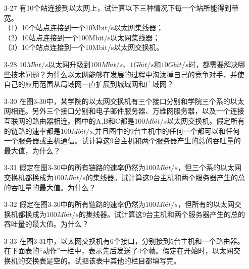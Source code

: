 \documentclass[a4paper,UTF8]{article}
\begin{document}
\begin{enumerate}
\begin{solution}
\end{solution}

\item[3-27] 有10个站连接到以太网上，试计算以下三种情况下每一个站所能得到带宽。\\
（1）10个站点连接到一个10Mbit/s以太网集线器；\\
（2）10站点连接到一个100Mbit/s以太网集线器；\\
（3）10个站点连接到一个10Mbit/s以太网交换机。
\begin{solution}

\end{solution}

\item[3-28] $10Mbit/s$以太网升级到$100Mbit/s$、$1Gbit/s$和$10Gbit/s$时，都需要解决哪些技术问题？为什么以太网能够在发展的过程中淘汰掉自己的竞争对手，并使自己的应用范围从局域网一直扩展到城域网和广域网？
\begin{solution}

\end{solution}

\item[3-30] 在图3-30中，某学院的以太网交换机有三个接口分别和学院三个系的以太网相连。另外三个接口分别和电子邮件服务器、万维网服务器，以及一个连接互联网的路由器相连。图中的A,B和C都是$100Mbit/s$以太网交换机。假定所有的链路的速率都是$100Mbit/s$,并且图中的9台主机中的任何一个都可以和任何一个服务器或主机通信。试计算这9台主机和两个服务器产生的总的吞吐量的最大值，为什么？ 
\begin{solution}

\end{solution}

\item[3-31] 假定在图3-30中的所有链路的速率仍然为$100Mbit/s$，但三个系的以太网交换机都换成为$100Mbit/s$的集线器。试计算这9台主机和两个服务器产生的总的吞吐量的最大值。为什么？ 
\begin{solution}

\end{solution}

\item[3-32] 假定在图3-30中的所有链路的速率仍然为$100Mbit/s$，但所有的以太网交换机都换成为$100Mbit/s$的集线器。试计算这9台主机和两个服务器产生的总的吞吐量的最大值。为什么？ 
\begin{solution}

\end{solution}

\item[3-33] 在图3-31中，以太网交换机有6个接口，分别接到5台主机和一个路由器。在下面表的“动作”一栏中，表示先后发送了4个帧。假定在开始时，以太网交换机的交换表是空的。试把该表中其他的栏目都填写完。

\end{enumerate}
\end{document}
